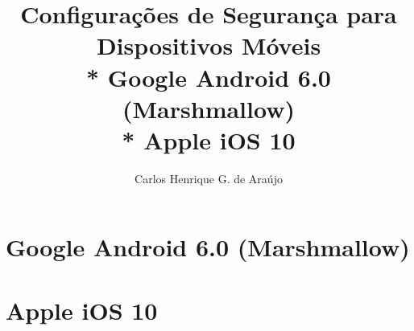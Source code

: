 \documentclass[12pt,oneside]{book}
\begin{document}
\frontmatter

\title{Configura\c c\~oes de Seguran\c ca para Dispositivos M\'oveis
\\* Google Android 6.0 (Marshmallow)
\\* Apple iOS 10}
\author{Carlos Henrique G. de Ara\'ujo}

\maketitle

\tableofcontents

\mainmatter



\part{Google Android 6.0 (Marshmallow)}





\part{Apple iOS 10}






\end{document}
